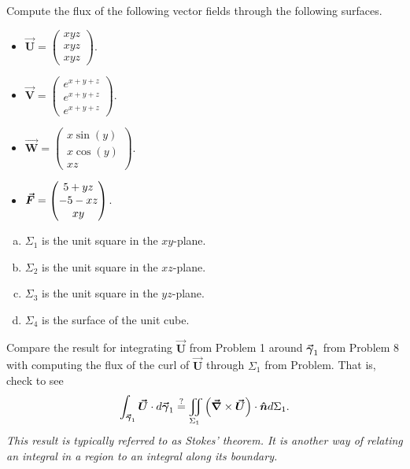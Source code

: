 \documentclass[12pt]{article} %
\newcommand{\vecfieldV}{\boldsymbol{\vec{V}}}
\newcommand{\vecfieldU}{\boldsymbol{\vec{U}}}
\newcommand{\vecfieldW}{\boldsymbol{\vec{W}}}
\begin{document}
\begin{problem}
Compute the flux of the following vector fields through the following surfaces.
\begin{itemize}
    \item $\vecfieldU = \begin{pmatrix} xyz \\ xyz \\ xyz \end{pmatrix}$.
    \item $\vecfieldV = \begin{pmatrix} e^{x+y+z} \\ e^{x+y+z} \\ e^{x+y+z} \end{pmatrix}$.
    \item $\vecfieldW = \begin{pmatrix} x \sin(y) \\ x \cos(y) \\ xz \end{pmatrix}$.
    \item $\boldsymbol{\vec{F}} = \begin{pmatrix} 5 + yz \\ -5 -xz \\ xy \end{pmatrix}$.
\end{itemize}
\begin{multicols}{2}
\begin{enumerate}[(a)]
    \item $\Sigma_1$ is the unit square in the $xy$-plane.  
    \item $\Sigma_2$ is the unit square in the $xz$-plane.
    \item $\Sigma_3$ is the unit square in the $yz$-plane.
    \item $\Sigma_4$ is the surface of the unit cube.
\end{enumerate}
\end{multicols}
\end{problem}
\begin{solution}

\end{solution}

\newpage
\begin{problem}
Compare the result for integrating $\vecfieldU$ from Problem 1 around $\boldsymbol{\vec{\gamma}}_1$ from Problem 8 with computing the flux of the curl of $\vecfieldU$ through $\Sigma_1$ from Problem. That is, check to see
\[
\int_{\curvegamma_1} \vecfieldU \cdot d\curvegamma_1 \stackrel{?}{=} \iint_{\Sigma_1} \left(\grad \times \vecfieldU \right)\cdot \unitvec d\Sigma_1.
\]
\emph{This result is typically referred to as Stokes' theorem. It is another way of relating an integral in a region to an integral along its boundary.}
\end{problem}
\begin{solution}

\end{solution}

\newpage
\end{document}
